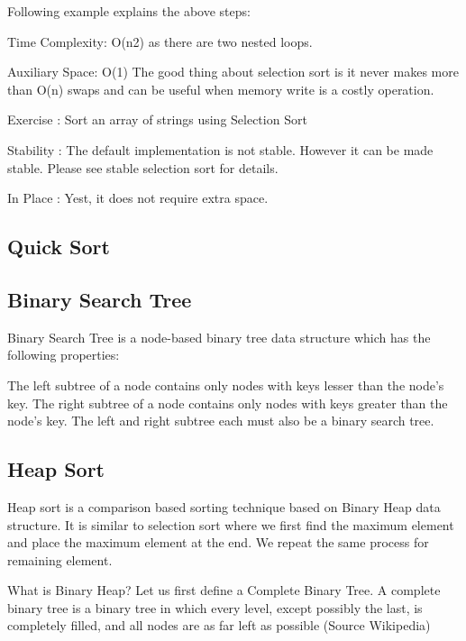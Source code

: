 \documentclass{article}
\begin{document}
Following example explains the above steps:


Time Complexity: O(n2) as there are two nested loops.

Auxiliary Space: O(1)
The good thing about selection sort is it never makes more than O(n) swaps and can be useful when memory write is a costly operation.

Exercise : 
Sort an array of strings using Selection Sort

Stability : The default implementation is not stable. However it can be made stable. Please see stable selection sort for details.

In Place : Yest, it does not require extra space.







\subsection{Quick Sort}








\subsection{Binary Search Tree}

Binary Search Tree is a node-based binary tree data structure which has the following properties:

The left subtree of a node contains only nodes with keys lesser than the node’s key.
The right subtree of a node contains only nodes with keys greater than the node’s key.
The left and right subtree each must also be a binary search tree.








\subsection{Heap Sort}

Heap sort is a comparison based sorting technique based on Binary Heap data structure. It is similar to selection sort where we first find the maximum element and place the maximum element at the end. We repeat the same process for remaining element.

What is Binary Heap?
Let us first define a Complete Binary Tree. A complete binary tree is a binary tree in which every level, except possibly the last, is completely filled, and all nodes are as far left as possible (Source Wikipedia)
\end{document}
